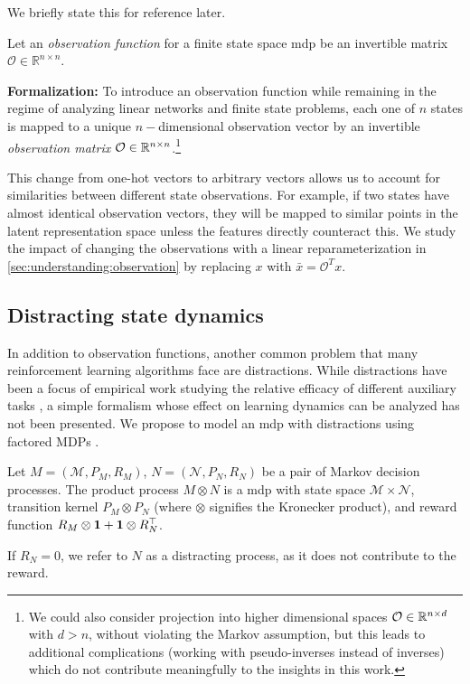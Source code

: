 We briefly state this for reference later.
\begin{assumption}
    \label{assumption:understanding:2}
    Let an \emph{observation function} for a finite state space \ac{mdp} be an invertible matrix $\mathcal{O} \in \mathbb{R}^{n \times n}$.
\end{assumption}

\textbf{Formalization:} To introduce an observation function while remaining in the regime of analyzing linear networks and finite state problems, each one of $n$ states is mapped to a unique $n-$dimensional observation vector by an invertible \emph{observation matrix} ${\mathcal{O}} \in \mathbb{R}^{n \times n}$.\footnote{We could also consider projection into higher dimensional spaces ${\mathcal{O}} \in \mathbb{R}^{n \times d}$ with $d > n$, without violating the Markov assumption, but this leads to additional complications (working with pseudo-inverses instead of inverses) which do not contribute meaningfully to the insights in this work.}

This change from one-hot vectors to arbitrary vectors allows us to account for similarities between different state observations.
For example, if two states have almost identical observation vectors, they will be mapped to similar points in the latent representation space unless the features directly counteract this.
We study the impact of changing the observations with a linear reparameterization in \autoref{sec:understanding:observation} by replacing $x$ with $\bar{x} = \mathcal{O}^T x$.

\subsection{Distracting state dynamics}
In addition to observation functions, another common problem that many reinforcement learning algorithms face are distractions.
While distractions have been a focus of empirical work studying the relative efficacy of different auxiliary tasks \parencite{ni2024bridging}, a simple formalism whose effect on learning dynamics can be analyzed has not been presented. 
We propose to model an \ac{mdp}  with distractions using factored MDPs \parencite{boutilier2000stochastic}.

\begin{definition}\label{def:distracting}
Let $M=(\mathcal{M}, P_{M},R_M)$,  $N=(\mathcal{N},P_N,R_N)$ be a pair of Markov decision processes.
The product process $M \otimes N$ is a \ac{mdp}  with state space $\mathcal{M}\times \mathcal{N}$, transition kernel $P_M\otimes P_N$ (where $\otimes$ signifies the Kronecker product), and reward function $R_M\otimes {\bm{1}} +{\bm{1}} \otimes R_N^\top$.

If $R_N = 0$, we refer to $N$ as a distracting process, as it does not contribute to the reward.
\end{definition}

